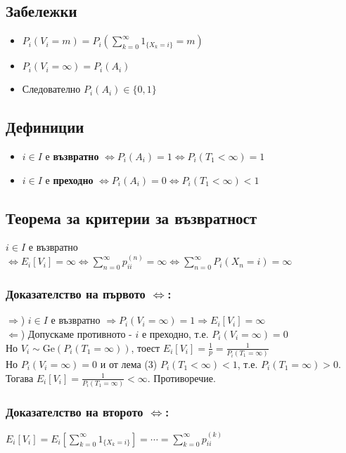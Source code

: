 \documentclass{article}
\begin{document}
\subsection{Забележки}
\begin{itemize}
\item $P_i(V_i = m) = P_i\left(\sum_{k=0}^\infty 1_{\{X_k = i\}} = m\right)$
\item $P_i(V_i = \infty) = P_i(A_i)$
\item Следователно $P_i(A_i) \in \{0,1\}$
\end{itemize}

\subsection{Дефиниции}
\begin{itemize}
\item $i \in I$ е \textbf{възвратно} $\Leftrightarrow P_i(A_i) = 1 \Leftrightarrow P_i(T_1 < \infty) = 1$
\item $i \in I$ е \textbf{преходно} $\Leftrightarrow P_i(A_i) = 0 \Leftrightarrow P_i(T_1 < \infty) < 1$
\end{itemize}

\subsection{Теорема за критерии за възвратност}
$i \in I$ е възвратно $\Leftrightarrow E_i[V_i] = \infty \Leftrightarrow \sum_{n=0}^\infty p_{ii}^{(n)} = \infty \Leftrightarrow \sum_{n=0}^\infty P_i(X_n = i) = \infty$

\subsubsection*{Доказателство на първото $\Leftrightarrow$:}
$\Rightarrow$) $i \in I$ е възвратно $\Rightarrow P_i(V_i = \infty) = 1 \Rightarrow E_i[V_i] = \infty$ \\

$\Leftarrow$) Допускаме противното - $i$ е преходно, т.е. $P_i(V_i = \infty) = 0$ \\
Но $V_i \sim \mathrm{Ge}(P_i(T_1 = \infty))$, тоест $E_i[V_i] = \frac{1}{p} = \frac{1}{P_i(T_1 = \infty)}$ \\
Но $P_i(V_i = \infty) = 0$ и от лема (3) $P_i(T_1 < \infty) < 1$, т.е. $P_i(T_1 = \infty) > 0$. \\
Тогава $E_i[V_i] = \frac{1}{P_i(T_1 = \infty)} < \infty$. Противоречие.

\subsubsection*{Доказателство на второто $\Leftrightarrow$:}
$E_i[V_i] = E_i\left[\sum_{k=0}^\infty 1_{\{X_k = i\}}\right] = \cdots = \sum_{k=0}^\infty p_{ii}^{(k)}$
\end{document}
